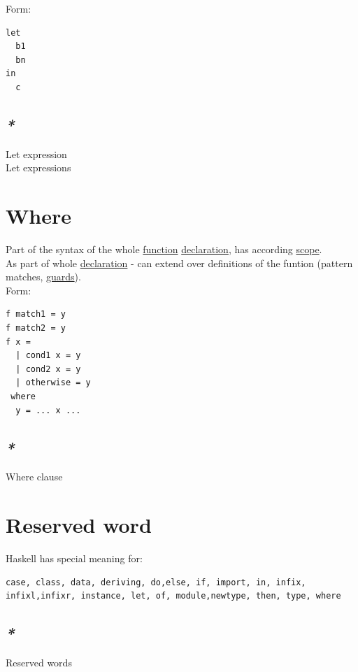 \documentclass[a4paper,14pt,oneside]{book}
\begin{document}
Form:\\
\begin{verbatim}
let
  b1
  bn
in
  c
\end{verbatim}

\subsection{\emph{*}}
\label{sec:org40ecd2a}

\label{org0935e1b}Let expression\\
\label{orgd32db0b}Let expressions\\

\section{\label{org002404a}Where}
\label{sec:org6e3a9b6}
Part of the syntax of the whole \hyperref[org39271b2]{function} \hyperref[org1113171]{declaration}, has according \hyperref[org2dbd72d]{scope}.\\

As part of whole \hyperref[org1113171]{declaration} - can extend over definitions of the funtion (pattern matches, \hyperref[org603f160]{guards}).\\

Form:\\
\begin{verbatim}
f match1 = y
f match2 = y
f x =
  | cond1 x = y
  | cond2 x = y
  | otherwise = y
 where
  y = ... x ...
\end{verbatim}

\subsection{\emph{*}}
\label{sec:org7280d0b}

\label{org9684df7}Where clause\\

\section{\label{orgf372864}Reserved word}
\label{sec:orgdc7e603}
Haskell has special meaning for:\\
\begin{verbatim}
case, class, data, deriving, do,else, if, import, in, infix, infixl,infixr, instance, let, of, module,newtype, then, type, where
\end{verbatim}

\subsection{\emph{*}}
\label{sec:orgf064a73}
\label{org806741c}Reserved words\\
\end{document}
